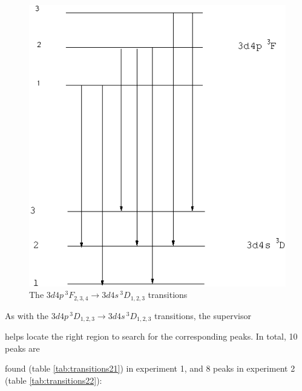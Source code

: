 \documentclass[a4paper]{article}
\begin{document}
\begin{figure}[htb!]

\centering

\includegraphics[scale=0.35]{transition2}

\caption{The $3d4p\,^3F_{2,3,4} \to 3d4s\,^3D_{1,2,3}$ transitions}

\label{fig:transition2}

\end{figure}

As with the $3d4p\,^3D_{1,2,3} \to 3d4s\,^3D_{1,2,3}$ transitions, the supervisor

helps locate the right region to search for the corresponding peaks. In total, 10 peaks are

found (table \ref{tab:transitions21}) in experiment 1, and 8 peaks in experiment 2 (table \ref{tab:transitions22}):
\end{document}

